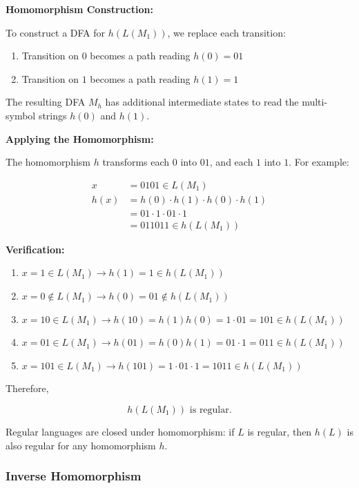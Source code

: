 \documentclass[12pt,a4paper,openany]{article}
\begin{document}
\textbf{Homomorphism Construction:}

To construct a DFA for $h(L(M_1))$, we replace each transition:

\begin{enumerate}
    \item Transition on $0$ becomes a path reading $h(0) = 01$
    \item Transition on $1$ becomes a path reading $h(1) = 1$
\end{enumerate}

The resulting DFA $M_h$ has additional intermediate states to read the multi-symbol strings $h(0)$ and $h(1)$.

\textbf{Applying the Homomorphism:}

The homomorphism $h$ transforms each $0$ into $01$, and each $1$ into $1$. For example:

\begin{align*}
x &= 0101 \in L(M_1) \\
h(x) &= h(0) \cdot h(1) \cdot h(0) \cdot h(1) \\
&= 01 \cdot 1 \cdot 01 \cdot 1 \\
&= 011011 \in h(L(M_1))
\end{align*}

\textbf{Verification:}

\begin{enumerate}
    \item $x = 1 \in L(M_1) \to h(1) = 1 \in h(L(M_1))$
    \item $x = 0 \notin L(M_1) \to h(0) = 01 \notin h(L(M_1))$
    \item $x = 10 \in L(M_1) \to h(10) = h(1)h(0) = 1 \cdot 01 = 101 \in h(L(M_1))$
    \item $x = 01 \in L(M_1) \to h(01) = h(0)h(1) = 01 \cdot 1 = 011 \in h(L(M_1))$
    \item $x = 101 \in L(M_1) \to h(101) = 1 \cdot 01 \cdot 1 = 1011 \in h(L(M_1))$
\end{enumerate}

Therefore,

\[ h(L(M_1)) \text{ is regular.} \]

Regular languages are closed under homomorphism: if $L$ is regular, then $h(L)$ is also regular for any homomorphism $h$.

\subsubsection{Inverse Homomorphism}
\end{document}
